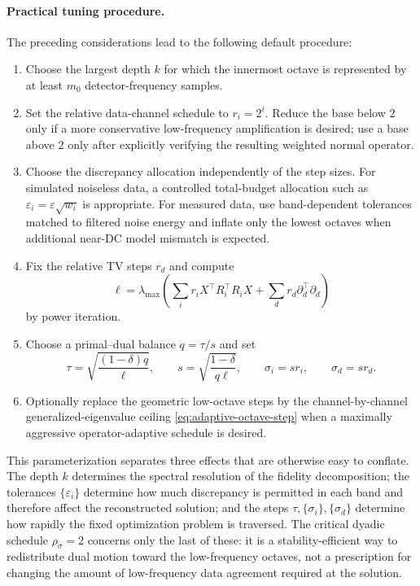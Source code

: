 \documentclass{article}
\begin{document}
\paragraph{Practical tuning procedure.}
The preceding considerations lead to the following default procedure:
\begin{enumerate}[label=\textup{(\roman*)}]
\item
Choose the largest depth $k$ for which the innermost octave is
represented by at least $m_0$ detector-frequency samples.

\item
Set the relative data-channel schedule to
$r_i=2^i$.  Reduce the base below $2$ only if a more conservative
low-frequency amplification is desired; use a base above $2$ only
after explicitly verifying the resulting weighted normal operator.

\item
Choose the discrepancy allocation independently of the step sizes.
For simulated noiseless data, a controlled total-budget allocation
such as $\varepsilon_i=\varepsilon\sqrt{w_i}$ is appropriate.
For measured data, use band-dependent tolerances matched to filtered
noise energy and inflate only the lowest octaves when additional
near-DC model mismatch is expected.

\item
Fix the relative TV steps $r_d$ and compute
\[
\ell
=
\lambda_{\max}
\left(
\sum_i r_iX^\top R_i^\top R_iX
+
\sum_dr_d\partial_d^\top\partial_d
\right)
\]
by power iteration.

\item
Choose a primal--dual balance $q=\tau/s$ and set
\[
\tau
=
\sqrt{\frac{(1-\delta)q}{\ell}},
\qquad
s
=
\sqrt{\frac{1-\delta}{q\ell}},
\qquad
\sigma_i=sr_i,
\qquad
\sigma_d=sr_d.
\]

\item
Optionally replace the geometric low-octave steps by the
channel-by-channel generalized-eigenvalue ceiling
\eqref{eq:adaptive-octave-step} when a maximally aggressive
operator-adaptive schedule is desired.
\end{enumerate}

This parameterization separates three effects that are otherwise easy
to conflate.  The depth $k$ determines the spectral resolution of the
fidelity decomposition; the tolerances $\{\varepsilon_i\}$ determine
how much discrepancy is permitted in each band and therefore affect
the reconstructed solution; and the steps
$\tau,\{\sigma_i\},\{\sigma_d\}$ determine how rapidly the fixed
optimization problem is traversed.  The critical dyadic schedule
$\rho_\sigma=2$ concerns only the last of these: it is a
stability-efficient way to redistribute dual motion toward the
low-frequency octaves, not a prescription for changing the amount of
low-frequency data agreement required at the solution.
\end{document}
